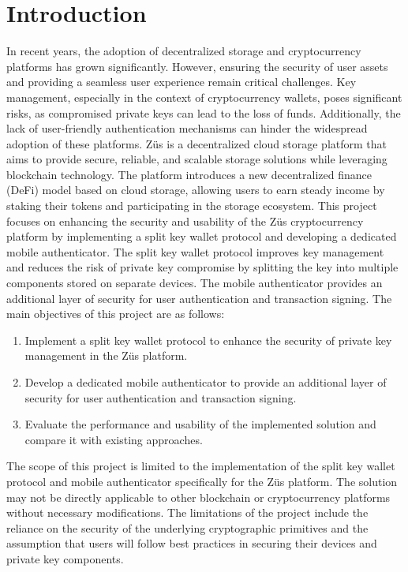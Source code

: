 \chapter{Introduction}
\label{ch:chapter1}
In recent years, the adoption of decentralized storage and cryptocurrency platforms has grown significantly.
However, ensuring the security of user assets and providing a seamless user experience remain critical challenges.
Key management, especially in the context of cryptocurrency wallets, poses significant risks, as compromised private keys can lead to the loss of funds.
Additionally, the lack of user-friendly authentication mechanisms can hinder the widespread adoption of these platforms.
Züs is a decentralized cloud storage platform that aims to provide secure, reliable, and scalable storage solutions while leveraging blockchain technology. The platform introduces a new decentralized finance (DeFi) model based on cloud storage, allowing users to earn steady income by staking their tokens and participating in the storage ecosystem.
This project focuses on enhancing the security and usability of the Züs cryptocurrency platform by implementing a split key wallet protocol and developing a dedicated mobile authenticator. The split key wallet protocol improves key management and reduces the risk of private key compromise by splitting the key into multiple components stored on separate devices. The mobile authenticator provides an additional layer of security for user authentication and transaction signing.
The main objectives of this project are as follows:
\begin{enumerate}
\item Implement a split key wallet protocol to enhance the security of private key management in the Züs platform.
\item Develop a dedicated mobile authenticator to provide an additional layer of security for user authentication and transaction signing.
\item Evaluate the performance and usability of the implemented solution and compare it with existing approaches.
\end{enumerate}
The scope of this project is limited to the implementation of the split key wallet protocol and mobile authenticator specifically for the Züs platform. The solution may not be directly applicable to other blockchain or cryptocurrency platforms without necessary modifications.
The limitations of the project include the reliance on the security of the underlying cryptographic primitives and the assumption that users will follow best practices in securing their devices and private key components.
